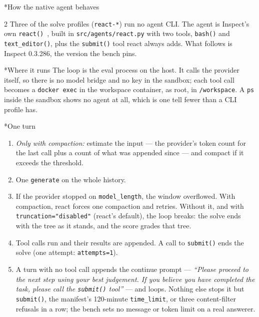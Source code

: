 \documentclass[10pt,a4paper]{article}
\makeatletter
\renewcommand\section{\@startsection{section}{1}{0pt}{0pt}{6pt}%
  {\display\bfseries\Large\color{ink}}}
\renewcommand\subsection{\@startsection{subsection}{2}{0pt}{8pt}{2pt}%
  {\display\bfseries\normalsize\color{ink}}}
\newcommand{\claim}[1]{{\color{inksec}#1}\par}
\makeatother
\begin{document}
\section*{How the native agent behaves}
\begin{multicols}{2}
\claim{Three of the solve profiles (\texttt{react-*}) run no agent CLI.
The agent is Inspect's own \texttt{react()}~\cite{inspect}, built in
\texttt{src/agents/react.py} with two tools, \texttt{bash()} and
\texttt{text\_editor()}, plus the \texttt{submit()} tool react always
adds. What follows is Inspect 0.3.286, the version the bench pins.}

\subsection*{Where it runs}
The loop is the eval process on the host. It calls the provider itself,
so there is no model bridge and no key in the sandbox; each tool call
becomes a \texttt{docker exec} in the workspace container, as root, in
\texttt{/workspace}. A \texttt{ps} inside the sandbox shows no agent at
all, which is one tell fewer than a CLI profile has.

\subsection*{One turn}
\begin{enumerate}[leftmargin=1.4em]
\item \emph{Only with compaction:} estimate the input — the provider's
  token count for the last call plus a count of what was appended since —
  and compact if it exceeds the threshold.
\item One \texttt{generate} on the whole history.
\item If the provider stopped on \texttt{model\_length}, the window
  overflowed. With compaction, react forces one compaction and retries.
  Without it, and with \texttt{truncation="disabled"} (react's default),
  the loop breaks: the solve ends with the tree as it stands, and the
  score grades that tree.
\item Tool calls run and their results are appended. A call to
  \texttt{submit()} ends the solve (one attempt: \texttt{attempts=1}).
\item A turn with no tool call appends the continue prompt — \emph{“Please
  proceed to the next step using your best judgement. If you believe you
  have completed the task, please call the \texttt{submit()} tool”} — and
  loops. Nothing else stops it but \texttt{submit()}, the manifest's
  120-minute \texttt{time\_limit}, or three content-filter refusals in a
  row; the bench sets no message or token limit on a real answerer.
\end{enumerate}


\end{multicols}
\end{document}
